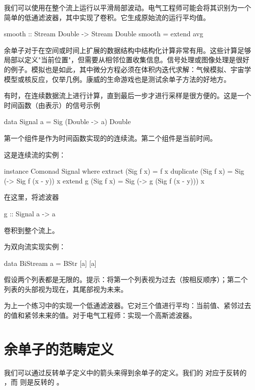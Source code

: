 \documentclass[DaoFP]{subfiles}
\begin{document}
我们可以使用在整个流上运行以平滑局部波动。电气工程师可能会将其识别为一个简单的低通滤波器，其中实现了卷积。它生成原始流的运行平均值。
\begin{haskell}
smooth :: Stream Double -> Stream Double
smooth = extend avg
\end{haskell}

余单子对于在空间或时间上扩展的数据结构中结构化计算非常有用。这些计算足够局部以定义"当前位置"，但需要从相邻位置收集信息。信号处理或图像处理是很好的例子。模拟也是如此，其中微分方程必须在体积内迭代求解：气候模拟、宇宙学模型或核反应，仅举几例。康威的生命游戏也是测试余单子方法的好地方。

有时，在连续数据流上进行计算，直到最后一步才进行采样是很方便的。这是一个时间函数（由表示）的信号示例
\begin{haskell}
data Signal a = Sig (Double -> a) Double
\end{haskell}
第一个组件是作为时间函数实现的的连续流。第二个组件是当前时间。

这是连续流的实例：
\begin{haskell}
instance Comonad Signal where
  extract (Sig f x) = f x
  duplicate (Sig f x) = Sig (\y -> Sig f (x - y)) x
  extend g (Sig f x) = Sig (\y -> g (Sig f (x - y))) x
\end{haskell}
在这里，将滤波器
\begin{haskell}
g :: Signal a -> a
\end{haskell}
卷积到整个流上。

\begin{exercise}
为双向流实现实例：
\begin{haskell}
data BiStream a = BStr [a] [a]
\end{haskell}
假设两个列表都是无限的。提示：将第一个列表视为过去（按相反顺序）；第二个列表的头部视为现在，其尾部视为未来。
\end{exercise}

\begin{exercise}
为上一个练习中的实现一个低通滤波器。它对三个值进行平均：当前值、紧邻过去的值和紧邻未来的值。对于电气工程师：实现一个高斯滤波器。
\end{exercise}

\section{余单子的范畴定义}

我们可以通过反转单子定义中的箭头来得到余单子的定义。我们的  对应于反转的 ，而  则是反转的 。
\end{document}
